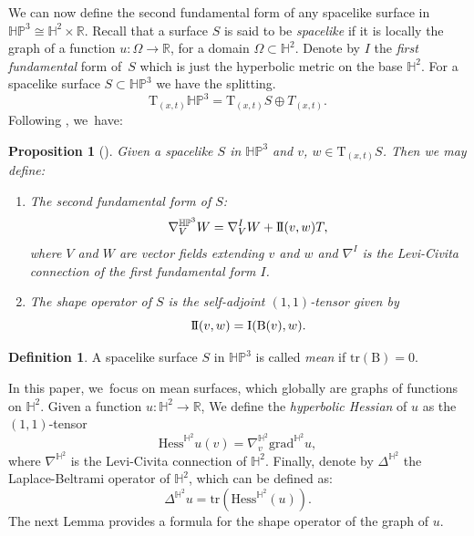 \documentclass[10pt]{amsart}
\theoremstyle{plain}
\newtheorem{prop}[cor]{Proposition}
\theoremstyle{definition}
\newtheorem{defi}[cor]{Definition}
\newcommand{\HP}{\mathbb{HP}^3}
\newcommand{\I}{\mathrm{I}}
\newcommand{\II}{\mathrm{I}\hspace{-0.04cm}\mathrm{I}}
\newcommand{\hess}{\mathrm{Hess}^{\mathbb{H}^2}}
\newcommand{\B}{\mathrm{B}}
\begin{document}
We can now define the second fundamental form of any spacelike surface in $\HP\cong\mathbb{H}^2\times\mathbb{R}$. Recall that a surface $S$ is said to be \emph{spacelike} if it is locally the graph of a function $u : \Omega \to\mathbb{R}$, for a domain $\Omega\subset \mathbb{H}^2$. Denote by $I$ the \emph{first fundamental} form of~$S$ which is just the hyperbolic metric on the base $\mathbb{H}^2$. For a spacelike surface $S\subset\HP$ we have the splitting.
\begin{equation}\label{splittingconnection}
\mathrm{T}_{(x,t)}\HP=\mathrm{T}_{(x,t)}S\oplus T_{(x,t)}.
\end{equation}
Following \cite{fillastreseppi}, we~have:
\begin{prop}[\cite{fillastreseppi}]
Given a spacelike $S$ in $\HP$ and $v$, $w\in\mathrm{T}_{(x,t)}S$. Then we may define:
\begin{enumerate}
\item The \emph{second fundamental form} of $S$:
\[
\nabla_V^{\HP}W=\nabla_V^{I}W+\II(v,w) T,
\]
where $V$ and $W$ are vector fields extending $v$ and $w$ and $\nabla^{I}$ is the Levi-Civita connection of the first fundamental form $I$.
\item The \emph{shape operator} of $S$ is the self-adjoint $(1, 1)$-tensor given by
\[
\II(v,w)=\I(\B(v),w).
\]
\end{enumerate}
\end{prop}
\begin{defi}\label{def_mean_surface}
A spacelike surface $S$ in $\HP$ is called \emph{mean} if $\mathrm{tr}(\B) = 0$.
\end{defi}
In this paper, we~focus on mean surfaces, which globally are graphs of functions on $\mathbb{H}^2$. Given a function $u:\mathbb{H}^2\to \mathbb{R}$, We define the \emph{hyperbolic Hessian} of $u$ as the $(1, 1)$-tensor
\[
\hess u(v)=\nabla^{\mathbb{H}^2}_v\mathrm{grad}^{\mathbb{H}^2} u,
\]
where $\nabla^{\mathbb{H}^2}$ is the Levi-Civita connection of $\mathbb{H}^2$. Finally, denote by $\Delta^{\mathbb{H}^2}$ the Laplace-Beltrami operator of $\mathbb{H}^2$, which can be defined as:
\[
\Delta^{\mathbb{H}^2}u=\mathrm{tr}(\hess(u)).
\]
The next Lemma provides a formula for the shape operator of the graph of $u$.
\end{document}
